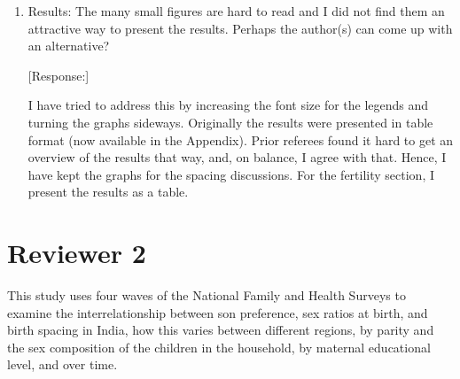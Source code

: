 \documentclass[letterpaper,12pt]{article}
\begin{document}
\begin{enumerate}
\item Results: The many small figures are hard to read and I did not
find them an attractive way to present the results. Perhaps the
author(s) can come up with an alternative?

[Response:]

I have tried to address this by increasing the font size for the legends
and turning the graphs sideways. Originally the results were presented
in table format (now available in the Appendix). Prior referees found it
hard to get an overview of the results that way, and, on balance, I
agree with that. Hence, I have kept the graphs for the spacing
discussions. For the fertility section, I present the results as a
table.



\end{enumerate}

\newpage

\section*{Reviewer 2}

This study uses four waves of the National Family and Health Surveys to
examine the interrelationship between son preference, sex ratios at
birth, and birth spacing in India, how this varies between different
regions, by parity and the sex composition of the children in the
household, by maternal educational level, and over time.
\end{document}
